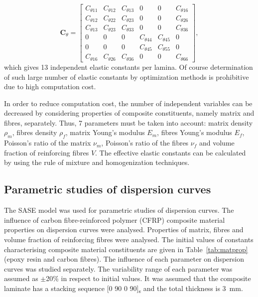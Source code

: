 \documentclass[preprint,12pt]{elsarticle}
\newcommand{\matr}[1]{\mathbf{#1}} %
\begin{document}
 \begin{equation}
 \matr{C}_{\theta} = \left[\begin{array}{cccccc} C_{\theta 11} & C_{\theta 12}& C_{\theta 13} & 0&0&C_{\theta 16}\\[2pt]
 C_{\theta 12}& C_{\theta 22} & C_{\theta 23}& 0 &0&C_{\theta 26}\\[2pt]
 C_{\theta 13}&C_{\theta 23}&C_{\theta 33}&0&0&C_{\theta 36}\\[2pt]
 0& 0&0&C_{\theta 44}& C_{\theta 45}&0\\[2pt]
 0&0&0&C_{\theta 45}&C_{\theta 55}&0\\[2pt]
 C_{\theta 16}&C_{\theta 26} &C_{\theta 36}&0&0&C_{\theta 66}
 \end{array}\right], 
 \label{eq:elastic_constatns_theta}
 \end{equation} 
 which gives 13 independent elastic constants per lamina. Of course determination of such large number of elastic constants by optimization methods is prohibitive due to high computation cost. 
 
 In order to reduce computation cost, the number of independent variables can be decreased by considering properties of composite constituents, namely matrix and fibres, separately. Thus,  7 parameters must be taken into account: matrix density $\rho_m$, fibres density $\rho_f$, matrix Young's modulus $E_m$, fibres Young's modulus $E_f$, Poisson's ratio of the matrix $\nu_m$, Poisson's ratio of the fibres $\nu_f$ and volume fraction of reinforcing fibres $V$. The effective elastic constants can be calculated by using the rule of mixture and homogenization techniques.
 \subsection{Parametric studies of dispersion curves \label{sec:parametric}}
 The SASE model was used for parametric studies of dispersion curves. The influence of carbon fibre-reinforced polymer (CFRP) composite material properties on dispersion curves were analysed. Properties of matrix, fibres and volume fraction of reinforcing fibres were analysed. The initial values of constants characterising composite material constituents are given in Table~\ref{tab:matprop} (epoxy resin and carbon fibres). The influence of each parameter on dispersion curves was studied separately. The variability range of each parameter was assumed as $\pm$20\% in respect to initial values. It was assumed that the composite laminate has a stacking sequence [0 90 0 90]\textsubscript{s} and the total thickness is 3~mm.
 
\end{document}
